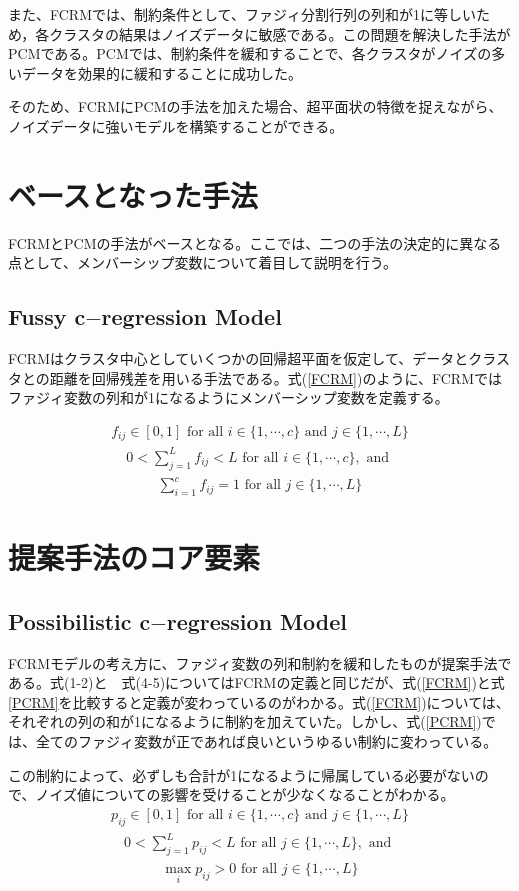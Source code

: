 \documentclass[10pt,onecolumn]{jsarticle}
\begin{document}
また、FCRMでは、制約条件として、ファジィ分割行列の列和が1に等しいため，各クラスタの結果はノイズデータに敏感である。この問題を解決した手法がPCMである。PCMでは、制約条件を緩和することで、各クラスタがノイズの多いデータを効果的に緩和することに成功した。

そのため、FCRMにPCMの手法を加えた場合、超平面状の特徴を捉えながら、ノイズデータに強いモデルを構築することができる。

\section{ベースとなった手法}
FCRMとPCMの手法がベースとなる。ここでは、二つの手法の決定的に異なる点として、メンバーシップ変数について着目して説明を行う。
\subsection{Fussy c$-$regression Model}
FCRMはクラスタ中心としていくつかの回帰超平面を仮定して、データとクラスタとの距離を回帰残差を用いる手法である。式(\ref{FCRM})のように、FCRMではファジィ変数の列和が1になるようにメンバーシップ変数を定義する。

\begin{align}
	f_{i j} \in[0,1] \text { for all } i \in\{1, \cdots, c\} \text { and } j \in\{1, \cdots, L\}
\end{align}
\begin{align}
	0<\sum_{j=1}^{L} f_{i j}<L \text { for all } i \in\{1, \cdots, c\}, \text { and }
\end{align}
\begin{align}
	\label{FCRM}
	\sum_{i=1}^{c} f_{i j}=1 \text { for all } j \in\{1, \cdots, L\}
\end{align}
\section{提案手法のコア要素}
\subsection{Possibilistic c$-$regression Model}
FCRMモデルの考え方に、ファジィ変数の列和制約を緩和したものが提案手法である。式(1-2)と　式(4-5)についてはFCRMの定義と同じだが、式(\ref{FCRM})と式\ref{PCRM}を比較すると定義が変わっているのがわかる。式(\ref{FCRM})については、それぞれの列の和が1になるように制約を加えていた。しかし、式(\ref{PCRM})では、全てのファジィ変数が正であれば良いというゆるい制約に変わっている。

この制約によって、必ずしも合計が1になるように帰属している必要がないので、ノイズ値についての影響を受けることが少なくなることがわかる。
\begin{align}
	p_{i j} \in[0,1] \text { for all } i \in\{1, \cdots, c\} \text { and } j \in\{1, \cdots, L\}
\end{align}
\begin{align}
	0<\sum_{j=1}^{L} p_{i j}<L \text { for all } j \in\{1, \cdots, L\}, \text { and }
\end{align}
\begin{align}
	\label{PCRM}
	\max _{i} p_{i j}>0 \text { for all } j \in\{1, \cdots, L\}
\end{align}
\end{document}
